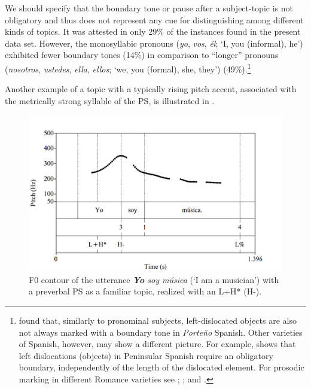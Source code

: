 \documentclass[output=paper]{langsci/langscibook}
\begin{document}
  We should specify that the boundary tone or pause after a subject-topic is not obligatory and thus does not represent any cue for distinguishing among different kinds of topics. It was attested in only 29\% of the instances found in the present data set. However, the monosyllabic pronouns (\textit{yo}, \textit{vos}, \textit{él}; ‘I, you (informal), he’) exhibited fewer boundary tones (14\%) in comparison to ``longer'' pronouns (\textit{nosotros}, \textit{ustedes}, \textit{ella}, \textit{ellos}; ‘we, you (formal), she, they’) (49\%).\footnote{\citet{Feldhausen2010bantu} found that, similarly to pronominal subjects, left-dislocated objects are also not always marked with a boundary tone in \textit{Porte{\~n}o} Spanish. Other varieties of Spanish, however, may show a different picture. For example, \citet{Feldhausen2016} shows that left dislocations (objects) in Peninsular Spanish require an obligatory boundary, independently of the length of the dislocated element. For prosodic marking in different Romance varieties see \citet{DImperio2005}; \citet{Frota2007}; and \citet{Feldhausen2010nequen}.}

Another example of a topic with a typically rising pitch accent, associated with the metrically strong syllable of the PS, is illustrated in .\largerpage[2]

  
\begin{figure}[H]
\includegraphics[width=.9\textwidth]{figures/pes-img14.png}
\caption{F0 contour of the utterance \textit{\textbf{Yo} soy música} (‘I am a musician’) with a preverbal PS as a familiar topic, realized with an L+H* (H-).\label{fig:pes:14}}
\end{figure}\clearpage
\end{document}
